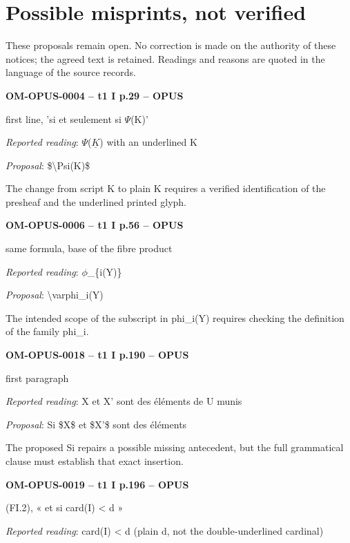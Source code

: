 \chapter*{Possible misprints, not verified}
These proposals remain open. No correction is made on the authority of these notices; the agreed text is retained. Readings and reasons are quoted in the language of the source records.
\begingroup\small\raggedright\sloppy\setlength{\parskip}{4pt}
\par\noindent\textbf{OM-OPUS-0004 -- t1 I p.29 -- OPUS}\par
first line, 'si et seulement si \ensuremath{\Psi}(K)'\par
\emph{Reported reading}: \ensuremath{\Psi}(\ensuremath{\underline{K}}) with an underlined K\par
\emph{Proposal}: \$\textbackslash{}Psi(K)\$\par
The change from script K to plain K requires a verified identification of the presheaf and the underlined printed glyph.\par
\par\noindent\textbf{OM-OPUS-0006 -- t1 I p.56 -- OPUS}\par
same formula, base of the fibre product\par
\emph{Reported reading}: \ensuremath{\phi}\_\{i(Y)\}\par
\emph{Proposal}: \textbackslash{}varphi\_i(Y)\par
The intended scope of the subscript in phi\_i(Y) requires checking the definition of the family phi\_i.\par
\par\noindent\textbf{OM-OPUS-0018 -- t1 I p.190 -- OPUS}\par
first paragraph\par
\emph{Reported reading}: X et X' sont des éléments de U munis\par
\emph{Proposal}: Si \$X\$ et \$X'\$ sont des éléments\par
The proposed Si repairs a possible missing antecedent, but the full grammatical clause must establish that exact insertion.\par
\par\noindent\textbf{OM-OPUS-0019 -- t1 I p.196 -- OPUS}\par
(FI.2), « et si card(I) < d »\par
\emph{Reported reading}: card(I) < d (plain d, not the double-underlined cardinal)\par
